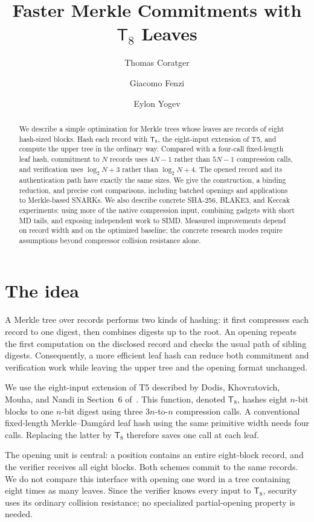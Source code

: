 \documentclass[11pt,letterpaper]{article}
\theoremstyle{definition} %
\newcommand{\Tate}{\mathsf{T}_{8}}
\begin{document}
\title{Faster Merkle Commitments with \texorpdfstring{$\Tate$}{T8} Leaves}
\author{Thomas Coratger \and Giacomo Fenzi \and Eylon Yogev}
\date{}
\maketitle

\begin{abstract}
We describe a simple optimization for Merkle trees whose leaves are records
of eight hash-sized blocks. Hash each record with $\Tate$, the eight-input
extension of T5, and compute the upper tree in the ordinary way. Compared
with a four-call fixed-length leaf hash, commitment to $N$ records uses
$4N-1$ rather than $5N-1$ compression calls, and verification uses
$\log_2N+3$ rather than $\log_2N+4$. The opened record and its authentication
path have exactly the same sizes. We give the construction, a binding
reduction, and precise cost comparisons, including batched openings and
applications to Merkle-based SNARKs. We also describe concrete SHA-256,
BLAKE3, and Keccak experiments: using more of the native compression input,
combining gadgets with short MD tails, and exposing independent work to SIMD.
Measured improvements depend on record width and on the optimized baseline;
the concrete research modes require assumptions beyond compressor collision
resistance alone.
\end{abstract}

\section{The idea}
A Merkle tree over records performs two kinds of hashing: it first compresses
each record to one digest, then combines digests up to the root. An opening
repeats the first computation on the disclosed record and checks the usual
path of sibling digests. Consequently, a more efficient leaf hash can reduce
both commitment and verification work while leaving the upper tree and the
opening format unchanged.

We use the eight-input extension of T5 described by Dodis, Khovratovich,
Mouha, and Nandi in Section~6 of~\cite{DKMN21}. This function, denoted
$\Tate$, hashes eight $n$-bit blocks to one $n$-bit digest using three
$3n$-to-$n$ compression calls. A conventional fixed-length
Merkle--Damg\aa rd leaf hash using the same primitive width needs four calls.
Replacing the latter by $\Tate$ therefore saves one call at each leaf.

The opening unit is central: a position contains an entire eight-block
record, and the verifier receives all eight blocks. Both schemes commit to
the same records. We do not compare this interface with opening one word
in a tree containing eight times as many leaves. Since the verifier knows
every input to $\Tate$, security uses its ordinary collision resistance;
no specialized partial-opening property is needed.
\end{document}

